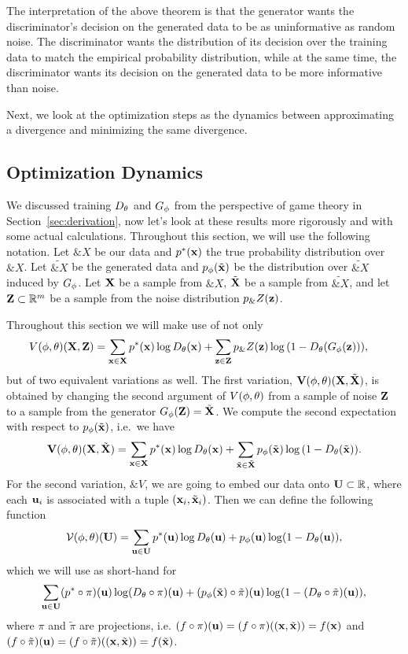 The interpretation of the above theorem is that the generator wants
the discriminator's decision on the generated data to be as
uninformative as random noise.  The discriminator wants the
distribution of its decision over the training data to match the
empirical probability distribution, while at the same time, the
discriminator wants its decision on the generated data to be more
informative than noise.

Next, we look at the optimization steps as the dynamics between
approximating a divergence and minimizing the same divergence.

\subsection{Optimization Dynamics}%
\label{sec:optimization-dynamics}

We discussed training $D_\theta$ and $G_\phi$ from the perspective of game
theory in Section~\ref{sec:derivation}, now let's look at these
results more rigorously and with some actual calculations. Throughout
this section, we will use the following notation. Let $\&X$ be our
data and $p^*(\mathbf{x})$ the true probability distribution over $\&X$. Let
$\tilde{\&X}$ be the generated data and $p_{\phi}(\tilde{\mathbf{x}})$ be the distribution over
$\tilde{\&X}$ induced by $G_\phi$. Let $\mathbf{X}$ be a sample from $\&X$,
$\tilde{\mathbf{X}}$ be a sample from $\tilde{\&X}$, and let
$\mathbf{Z} \subset \mathbb{R}^m$ be a sample from the noise distribution $p_\&Z(\mathbf{z})$.

Throughout this section we will make use of not only
\begin{align} V(\phi, \theta)(\mathbf{X}, \mathbf{Z}) & = \sum_{\mathbf{x} \in \mathbf{X}}p^*(\mathbf{x})\log{D_\theta(\mathbf{x})} +
  \sum_{\mathbf{z} \in \mathbf{Z}}p_\&Z(\mathbf{z})\log{(1 - D_\theta(G_\phi(\mathbf{z})))},
\end{align}
but of two equivalent variations as well. The first variation,
$\mathbf{V}(\phi, \theta)(\mathbf{X}, \tilde{\mathbf{X}})$, is obtained by changing the
second argument of $V(\phi, \theta)$ from a sample of noise $\mathbf{Z}$ to a sample from
the generator $G_\phi(\mathbf{Z}) = \tilde{\mathbf{X}}$. We compute the second
expectation with respect to $p_{\phi}(\tilde{\mathbf{x}})$, i.e.\ we have
\begin{align}
  \mathbf{V}(\phi, \theta)(\mathbf{X}, \tilde{\mathbf{X}}) = \sum_{\mathbf{x} \in \mathbf{X}}p^*(\mathbf{x})\log{D_\theta(\mathbf{x})} + \sum_{\tilde{\mathbf{x}} \in\tilde{\mathbf{X}}}p_{\phi}(\tilde{\mathbf{x}})\log{(1 - D_\theta(\tilde{\mathbf{x}}))}.
\end{align}
For the second variation, $\&V$, we are going to embed our data onto $\mathbf{U}
\subset \mathbb{R}$, where each $\mathbf{u}_i$ is associated with a tuple $(\mathbf{x}_i,
\tilde{\mathbf{x}}_i)$. Then we can define the following function
\begin{align}
  \label{eq:joined}
  \mathcal{V}(\phi, \theta)(\mathbf{U}) = \sum_{\mathbf{u} \in \mathbf{U}} p^*(\mathbf{u}) \log D_\theta(\mathbf{u}) + p_{\phi}(\mathbf{u}) \log(1 - D_\theta(\mathbf{u})),
\end{align}
which we will use as short-hand for
\begin{align}
  \label{eq:joined-verbose}
  \sum_{\mathbf{u} \in \mathbf{U}} (p^* \circ \pi)(\mathbf{u})\log (D_\theta \circ \pi)(\mathbf{u}) + (p_{\phi}(\tilde{\mathbf{x}}) \circ \tilde{\pi})(\mathbf{u}) \log(1 - (D_\theta \circ \tilde{\pi})(\mathbf{u})),
\end{align}
where $\pi$ and $\tilde{\pi}$ are projections, i.e. $(f \circ \pi)(\mathbf{u}) = (f
\circ \pi)((\mathbf{x}, \tilde{\mathbf{x}})) = f(\mathbf{x})$ and $(f \circ \tilde{\pi})(\mathbf{u}) = (f
\circ \tilde{\pi})((\mathbf{x}, \tilde{\mathbf{x}})) = f(\tilde{\mathbf{x}})$.

